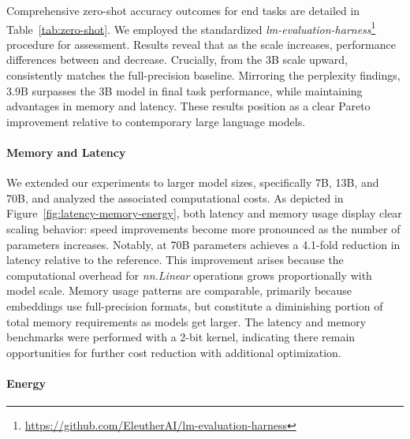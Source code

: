 Comprehensive zero-shot accuracy outcomes for end tasks are detailed in Table~\ref{tab:zero-shot}. We employed the standardized \emph{lm-evaluation-harness}\footnote{\url{https://github.com/EleutherAI/lm-evaluation-harness}} procedure for assessment. Results reveal that as the scale increases, performance differences between  and  decrease. Crucially, from the 3B scale upward,  consistently matches the full-precision baseline. Mirroring the perplexity findings,  3.9B surpasses the  3B model in final task performance, while maintaining advantages in memory and latency. These results position  as a clear Pareto improvement relative to contemporary large language models.

\paragraph{Memory and Latency}

We extended our experiments to larger model sizes, specifically 7B, 13B, and 70B, and analyzed the associated computational costs. As depicted in Figure~\ref{fig:latency-memory-energy}, both latency and memory usage display clear scaling behavior: speed improvements become more pronounced as the number of parameters increases. Notably,  at 70B parameters achieves a 4.1-fold reduction in latency relative to the  reference. This improvement arises because the computational overhead for \emph{nn.Linear} operations grows proportionally with model scale. Memory usage patterns are comparable, primarily because embeddings use full-precision formats, but constitute a diminishing portion of total memory requirements as models get larger. The latency and memory benchmarks were performed with a 2-bit kernel, indicating there remain opportunities for further cost reduction with additional optimization.

\paragraph{Energy}

